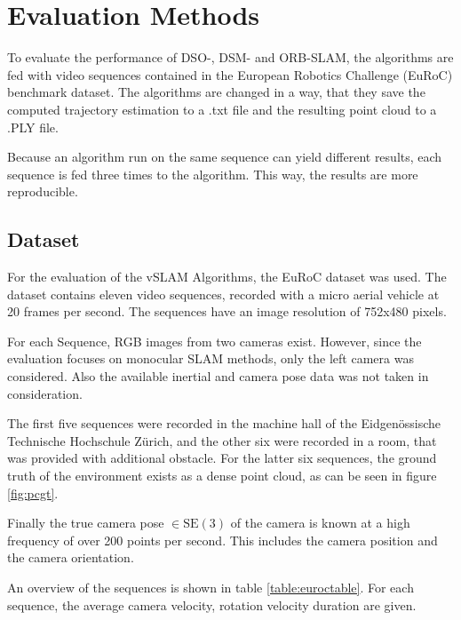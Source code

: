 \section{Evaluation Methods}\label{methsec}

To evaluate the performance of DSO-, DSM- and ORB-SLAM, the algorithms are fed with video sequences contained in the 
European Robotics Challenge (EuRoC) benchmark dataset. The algorithms are changed in a way, that they save the computed 
trajectory estimation to a .txt file and the resulting point cloud to a .PLY file. 

Because an algorithm run on the same sequence can yield different results, each sequence is fed three times to the algorithm. 
This way, the results are more reproducible. 

\subsection{Dataset}

	For the evaluation of the vSLAM Algorithms, the EuRoC dataset \cite{euroc} was used.
	The dataset contains eleven video sequences, recorded with a micro aerial vehicle at 20 frames per second.
	The sequences have an image resolution of 752x480 pixels.
	
	For each Sequence, RGB images from two cameras exist. However, since the evaluation
	focuses on monocular SLAM methods, only the left camera was considered. Also the available 
	inertial and camera pose data was not taken in consideration. 
	
	The first five sequences were recorded in 
	the machine hall of the Eidgenössische Technische Hochschule Zürich, and the other six were recorded in a room, that was provided 
	with additional obstacle. For the latter six sequences, the ground truth of the environment 
	exists as a dense point cloud, as can be seen in figure \ref{fig:pcgt}.


	Finally the true camera pose $\in \text{SE}(3)$ of the 
	camera is known at a high frequency of over 200 points per second. This includes the camera position and the camera orientation. 
	
	An overview of the sequences is shown in table \ref{table:euroctable}. For each sequence, the average camera velocity, rotation velocity duration 
	are given. 



